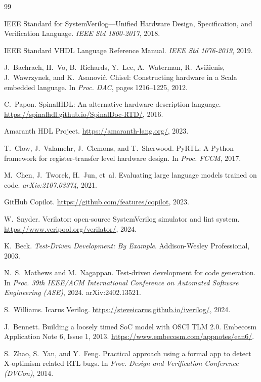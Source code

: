 \documentclass[manuscript]{acmart}
\begin{document}
\begin{thebibliography}{99}

IEEE Standard for SystemVerilog---Unified Hardware Design, Specification, and Verification Language.
\textit{IEEE Std 1800-2017}, 2018.

IEEE Standard VHDL Language Reference Manual.
\textit{IEEE Std 1076-2019}, 2019.

J.~Bachrach, H.~Vo, B.~Richards, Y.~Lee, A.~Waterman, R.~Avi\v{z}ienis, J.~Wawrzynek, and K.~Asanovi\'{c}.
Chisel: Constructing hardware in a Scala embedded language.
In \textit{Proc. DAC}, pages 1216--1225, 2012.

C.~Papon.
SpinalHDL: An alternative hardware description language.
\url{https://spinalhdl.github.io/SpinalDoc-RTD/}, 2016.

Amaranth HDL Project.
\url{https://amaranth-lang.org/}, 2023.

T.~Clow, J.~Valamehr, J.~Clemons, and T.~Sherwood.
PyRTL: A Python framework for register-transfer level hardware design.
In \textit{Proc. FCCM}, 2017.

M.~Chen, J.~Tworek, H.~Jun, et~al.
Evaluating large language models trained on code.
\textit{arXiv:2107.03374}, 2021.

GitHub Copilot.
\url{https://github.com/features/copilot}, 2023.

W.~Snyder.
Verilator: open-source SystemVerilog simulator and lint system.
\url{https://www.veripool.org/verilator/}, 2024.

K.~Beck.
\textit{Test-Driven Development: By Example}.
Addison-Wesley Professional, 2003.

N.~S.~Mathews and M.~Nagappan.
Test-driven development for code generation.
In \textit{Proc. 39th IEEE/ACM International Conference on Automated Software Engineering (ASE)}, 2024.
arXiv:2402.13521.

S.~Williams.
Icarus Verilog.
\url{https://steveicarus.github.io/iverilog/}, 2024.

J.~Bennett.
Building a loosely timed SoC model with OSCI TLM 2.0.
Embecosm Application Note 6, Issue 1, 2013.
\url{https://www.embecosm.com/appnotes/ean6/}.

S.~Zhao, S.~Yan, and Y.~Feng.
Practical approach using a formal app to detect X-optimism related RTL bugs.
In \textit{Proc. Design and Verification Conference (DVCon)}, 2014.


\end{thebibliography}
\end{document}
